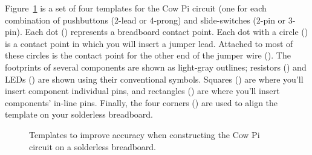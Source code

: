 Figure~\ref{fig:templates} is a set of four templates for the Cow Pi circuit (one for each combination of pushbuttons (2-lead or 4-prong) and slide-switches (2-pin or 3-pin).
Each dot () represents a breadboard contact point.
Each dot with a circle () is a contact point in which you will insert a jumper lead.
Attached to most of these circles is the contact point for the other end of the jumper wire ().
The footprints of several components are shown as light-gray outlines;
resistors () and LEDs () are shown using their conventional symbols.
Squares () are where you'll insert component individual pins,
and rectangles () are where you'll insert components' in-line pins.
Finally, the four corners () are used to align the template on your solderless breadboard.

\begin{figure}[p]
    \vspace{.5in}
    \caption{Templates to improve accuracy when constructing the Cow Pi circuit on a solderless breadboard.}\label{fig:templates}%
\end{figure}

